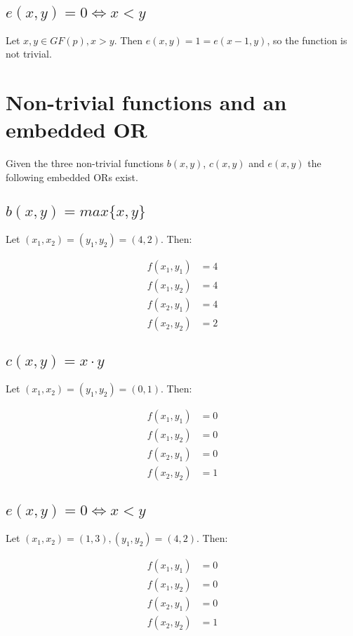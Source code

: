 \documentclass[a4paper]{scrreprt}
\begin{document}
\subsection{$e(x, y) = 0 \Leftrightarrow x < y$}

Let $x, y \in GF(p), x > y$. Then $e(x, y) = 1 = e(x - 1, y)$, so the function
is not trivial.


\section{Non-trivial functions and an embedded OR}

Given the three non-trivial functions $b(x, y)$, $c(x, y)$ and $e(x, y)$ the
following embedded ORs exist.

\subsection{\texorpdfstring{$b(x, y) = max\{x, y\}$}{b(x, y) = max\{x, y\}}}

Let $(x_1, x_2) = (y_1, y_2) = (4, 2)$. Then:

\begin{align*}
		f(x_1, y_1) & = 4 \\
		f(x_1, y_2) & = 4 \\
		f(x_2, y_1) & = 4 \\
		f(x_2, y_2) & = 2
\end{align*}

\subsection{\texorpdfstring{$c(x, y) = x \cdot y$}{c(x, y) = x * y}}

Let $(x_1, x_2) = (y_1, y_2) = (0, 1)$. Then:

\begin{align*}
		f(x_1, y_1) & = 0 \\
		f(x_1, y_2) & = 0 \\
		f(x_2, y_1) & = 0 \\
		f(x_2, y_2) & = 1
\end{align*}

\subsection{$e(x, y) = 0 \Leftrightarrow x < y$}

Let $(x_1, x_2) = (1, 3), (y_1, y_2) = (4, 2)$. Then:

\begin{align*}
		f(x_1, y_1) & = 0 \\
		f(x_1, y_2) & = 0 \\
		f(x_2, y_1) & = 0 \\
		f(x_2, y_2) & = 1
\end{align*}
\end{document}
